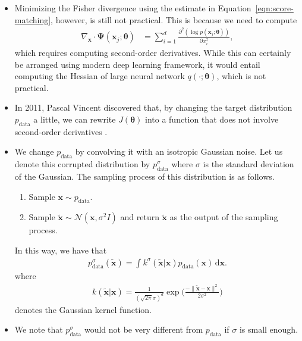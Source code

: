 \documentclass[10pt]{article}
\newcommand{\dee}{\mathrm{d}}
\newcommand{\ve}[1]{\mathbf{#1}}
\newcommand{\mrm}[1]{\mathrm{#1}}
\newcommand{\ves}[1]{\boldsymbol{#1}}
\newcommand{\mcal}[1]{\mathcal{#1}}
\begin{document}
\begin{itemize}
  \item Minimizing the Fisher divergence using the estimate in Equation~\eqref{eqn:score-matching}, however, is still not practical. This is because we need to compute
  \begin{align*}
    \nabla_{\ve{x}} \cdot \ves{\Psi}(\ve{x}_j;\ves{\theta})
    &= \sum_{i=1}^d \frac{\partial^2(\log p(\ve{x}_j;\ves{\theta}))}{\partial x_i^2},
  \end{align*}
  which requires computing second-order derivatives. While this can certainly be arranged using modern deep learning framework, it would entail computing the Hessian of large neural network $q(\cdot;\ves{\theta})$, which is not practical.

  \item In 2011, Pascal Vincent discovered that, by changing the target distribution $p_{\mrm{data}}$ a little, we can rewrite $J(\ves{\theta})$ into a function that does not involve second-order derivatives \cite{Vincent:2011}.
  
  \item We change $p_{\mrm{data}}$ by convolving it with an isotropic Gaussian noise. Let us denote this corrupted distribution by $p^\sigma_{\mrm{data}}$ where $\sigma$ is the standard deviation of the Gaussian. The sampling process of this distribution is as follows.
  \begin{enumerate}
    \item Sample $\ve{x} \sim p_{\mrm{data}}$.
    \item Sample $\widetilde{\ve{x}} \sim \mcal{N}(\ve{x}, \sigma^2I)$ and return $\widetilde{\ve{x}}$ as the output of the sampling process.
  \end{enumerate}
  In this way, we have that
  \begin{align*}
    p^\sigma_{\mrm{data}}(\widetilde{{\ve{x}}}) = \int k^\sigma(\widetilde{\ve{x}}|\ve{x}) p_{\mrm{data}}(\ve{x})\, \dee\ve{x}.
  \end{align*}
  where
  \begin{align*}
    k(\tilde{\ve{x}}|\ve{x}) = \frac{1}{(\sqrt{2\pi}\sigma)^d} \exp\bigg( \frac{-\| \widetilde{\ve{x}} - \ve{x} \|^2}{2\sigma^2} \bigg)
  \end{align*}
  denotes the Gaussian kernel function.

  \item We note that $p^\sigma_{\mrm{data}}$ would not be very different from $p_{\mrm{data}}$ if $\sigma$ is small enough.
  

\end{itemize}
\end{document}
